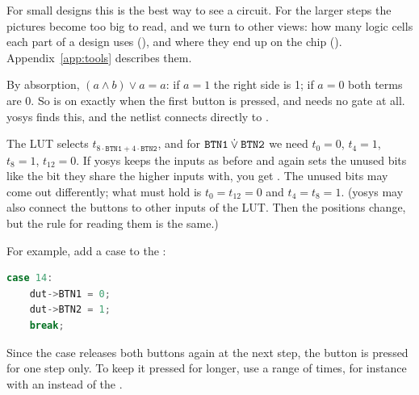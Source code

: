 For small designs this is the best way to see a circuit. For the larger steps
the pictures become too big to read, and we turn to other views: how many
logic cells each part of a design uses (), and where they end
up on the chip (). Appendix~\ref{app:tools} describes them.

\solutions

\solution
By absorption, $(a \wedge b) \vee a = a$: if $a = 1$ the right side is 1; if
$a = 0$ both terms are 0. So  is on exactly when the first button is
pressed, and  needs no gate at all. yosys finds this, and the netlist
connects  directly to .

\solution
The LUT selects $t_{8\cdot\mathtt{BTN1} + 4\cdot\mathtt{BTN2}}$, and for
$\mathtt{BTN1} \mathbin{\dot{\lor}} \mathtt{BTN2}$ we need $t_0 = 0$, $t_4 = 1$, $t_8 = 1$,
$t_{12} = 0$. If yosys keeps the inputs as before and again sets the unused
bits like the bit they share the higher inputs with, you get
. The unused bits may come out differently; what must
hold is $t_0 = t_{12} = 0$ and $t_4 = t_8 = 1$. (yosys may also connect the
buttons to other inputs of the LUT. Then the positions change, but the rule
for reading them is the same.)

\solution
For example, add a case to the :
\begin{lstlisting}[language=C++]
case 14:
    dut->BTN1 = 0;
    dut->BTN2 = 1;
    break;
\end{lstlisting}
Since the  case releases both buttons again at the next step,
the button is pressed for one step only. To keep it pressed for longer, use a
range of times, for instance with an  instead of the .
